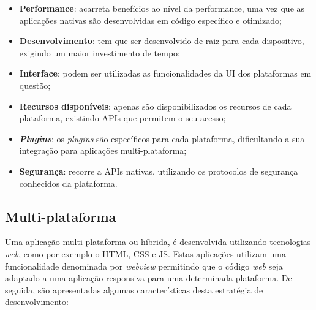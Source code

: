\begin{itemize}
	\item \textbf{Performance}: acarreta benefícios ao nível da performance, uma vez que as aplicações nativas são desenvolvidas em código específico e otimizado; 

	
	
	\item \textbf{Desenvolvimento}: tem que ser desenvolvido de raiz para cada dispositivo, exigindo um maior investimento de tempo;
	
	\item \textbf{Interface}: podem ser utilizadas as funcionalidades da \ac{UI} dos plataformas em questão;
	
	
	\item \textbf{Recursos disponíveis}: apenas são disponibilizados os recursos de cada plataforma, existindo APIs que permitem o seu acesso;
	
	

	\item \textbf{\textit{Plugins}}: os \textit{plugins} são específicos para cada plataforma, dificultando a sua integração para aplicações multi-plataforma; 
	
	
	\item \textbf{Segurança}: recorre a APIs nativas, utilizando os protocolos de segurança conhecidos da plataforma.
	
	
\end{itemize}


\subsection{Multi-plataforma}



Uma aplicação multi-plataforma ou híbrida, é desenvolvida utilizando tecnologias \textit{web}, como por exemplo o \ac{HTML}, \ac{CSS} e \ac{JS}. Estas aplicações utilizam uma funcionalidade denominada por \textit{webview} permitindo que o código \textit{web} seja adaptado a uma aplicação responsiva para uma determinada plataforma. De seguida, são apresentadas algumas características desta estratégia de desenvolvimento\cite{Ibm2012a}: 







